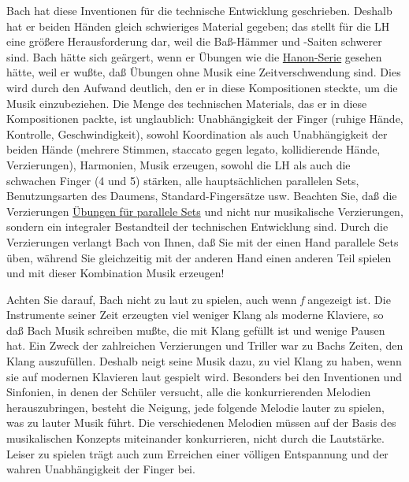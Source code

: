 Bach hat diese Inventionen für die technische Entwicklung geschrieben.
Deshalb hat er beiden Händen gleich schwieriges Material gegeben; das stellt für die LH eine größere Herausforderung dar, weil die Baß-Hämmer und -Saiten schwerer sind.
Bach hätte sich geärgert, wenn er Übungen wie die \hyperlink{c1iii7h}{Hanon-Serie} gesehen hätte, weil er wußte, daß Übungen ohne Musik eine Zeitverschwendung sind. Dies wird durch den Aufwand deutlich, den er in diese Kompositionen steckte, um die Musik einzubeziehen.
Die Menge des technischen Materials, das er in diese Kompositionen packte, ist unglaublich: Unabhängigkeit der Finger (ruhige Hände, Kontrolle, Geschwindigkeit), sowohl Koordination als auch Unabhängigkeit der beiden Hände (mehrere Stimmen, staccato gegen legato, kollidierende Hände, Verzierungen), Harmonien, Musik erzeugen, sowohl die LH als auch die schwachen Finger (4 und 5) stärken, alle hauptsächlichen parallelen Sets, Benutzungsarten des Daumens, Standard-Fingersätze usw.
Beachten Sie, daß die Verzierungen \hyperlink{c1iii7b}{Übungen für parallele Sets} und nicht nur musikalische Verzierungen, sondern ein integraler Bestandteil der technischen Entwicklung sind.
Durch die Verzierungen verlangt Bach von Ihnen, daß Sie mit der einen Hand parallele Sets üben, während Sie gleichzeitig mit der anderen Hand einen anderen Teil spielen und mit dieser Kombination Musik erzeugen!

Achten Sie darauf, Bach nicht zu laut zu spielen, auch wenn \textit{f} angezeigt ist.
Die Instrumente seiner Zeit erzeugten viel weniger Klang als moderne Klaviere, so daß Bach Musik schreiben mußte, die mit Klang gefüllt ist und wenige Pausen hat.
Ein Zweck der zahlreichen Verzierungen und Triller war zu Bachs Zeiten, den Klang auszufüllen.
Deshalb neigt seine Musik dazu, zu viel Klang zu haben, wenn sie auf modernen Klavieren laut gespielt wird.
Besonders bei den Inventionen und Sinfonien, in denen der Schüler versucht, alle die konkurrierenden Melodien herauszubringen, besteht die Neigung, jede folgende Melodie lauter zu spielen, was zu lauter Musik führt.
Die verschiedenen Melodien müssen auf der Basis des musikalischen Konzepts miteinander konkurrieren, nicht durch die Lautstärke.
Leiser zu spielen trägt auch zum Erreichen einer völligen Entspannung und der wahren Unabhängigkeit der Finger bei.

